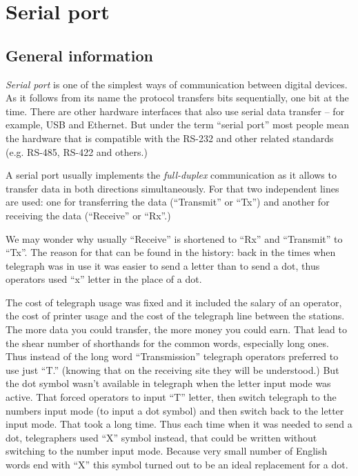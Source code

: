 \documentclass[../sparc.tex]{subfiles}
\begin{document}
\section{Serial port}
\label{section:communication-serial-port}

\subsection{General information}

\emph{Serial port} is one of the simplest ways of communication between digital
devices.  As it follows from its name the protocol transfers bits sequentially,
one bit at the time.  There are other hardware interfaces that also use serial
data transfer -- for example, USB and Ethernet.  But under the term ``serial
port'' most people mean the hardware that is compatible with the RS-232 and
other related standards (e.g. RS-485, RS-422 and others.)

A serial port usually implements the \emph{full-duplex} communication as it
allows to transfer data in both directions simultaneously.  For that two
independent lines are used: one for transferring the data (``Transmit'' or
``Tx'') and another for receiving the data (``Receive'' or ``Rx''.)

We may wonder why usually ``Receive'' is shortened to ``Rx'' and ``Transmit'' to
``Tx''. The reason for that can be found in the history: back in the times when
telegraph was in use it was easier to send a letter than to send a dot, thus
operators used ``x'' letter in the place of a dot.

The cost of telegraph usage was fixed and it included the salary of an operator,
the cost of printer usage and the cost of the telegraph line between the
stations.  The more data you could transfer, the more money you could earn.
That lead to the shear number of shorthands for the common words, especially
long ones.  Thus instead of the long word ``Transmission'' telegraph operators
preferred to use just ``T.'' (knowing that on the receiving site they will be
understood.)  But the dot symbol wasn't available in telegraph when the letter
input mode was active.  That forced operators to input ``T'' letter, then switch
telegraph to the numbers input mode (to input a dot symbol) and then switch back
to the letter input mode.  That took a long time.  Thus each time when it was
needed to send a dot, telegraphers used ``X'' symbol instead, that could be
written without switching to the number input mode.  Because very small number
of English words end with ``X'' this symbol turned out to be an ideal
replacement for a dot.
\end{document}
